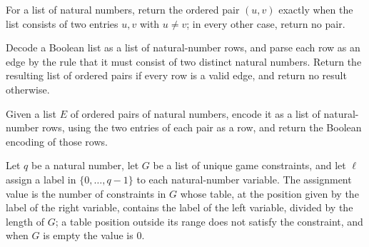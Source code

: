 \begin{definition}
\label{BooleanAnalysis.GaussianSpace.UniqueGames.parseMaxCutEdge}
\leanok
For a list of natural numbers, return the ordered pair $(u,v)$ exactly when the list
consists of two entries $u,v$ with $u\ne v$; in every other case, return no pair.
\end{definition}

\begin{definition}
\label{BooleanAnalysis.GaussianSpace.UniqueGames.parseMaxCut}
\leanok
{}
Decode a Boolean list as a list of natural-number rows, and parse each row as an edge by
the rule that it must consist of two distinct natural numbers. Return the resulting list
of ordered pairs if every row is a valid edge, and return no result otherwise.
\end{definition}

\begin{definition}
\label{BooleanAnalysis.GaussianSpace.UniqueGames.encodeMaxCut}
\leanok
{}
Given a list $E$ of ordered pairs of natural numbers, encode it as a list of
natural-number rows, using the two entries of each pair as a row, and return the Boolean
encoding of those rows.
\end{definition}

\begin{definition}
\label{BooleanAnalysis.GaussianSpace.UniqueGames.uniqueGameAssignmentValue}
\leanok
{}
Let $q$ be a natural number, let $G$ be a list of unique game constraints, and let
$\ell$ assign a label in $\{0,\ldots,q-1\}$ to each natural-number variable. The
assignment value is the number of constraints in $G$ whose table, at the position given
by the label of the right variable, contains the label of the left variable, divided by
the length of $G$; a table position outside its range does not satisfy the constraint,
and when $G$ is empty the value is $0$.
\end{definition}

